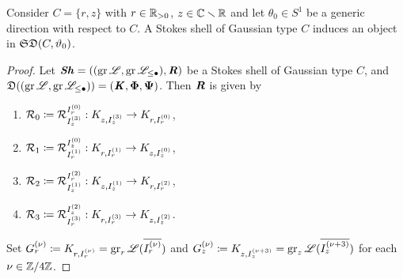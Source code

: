 \begin{lem}\label{shelltodata}
    Consider $C=\{r,z\}$ with $r \in \mathbb{R}_{>0}$, $z \in \mathbb{C} \smallsetminus \mathbb{R}$ and let $\theta_0 \in S^1$ be a generic direction with respect to $C$. A Stokes shell of Gaussian type $C$ induces an object in $\mathfrak{SD}(C,\vartheta_0)$.
\end{lem}
\begin{proof} 
    Let $\bm{\mathit{Sh}} =((\operatorname{gr}\mathscr{L}, \operatorname{gr}\mathscr{L}_{\leq \bullet}),\bm{\mathit{R}})$ be a Stokes shell of Gaussian type $C$, and $\mathfrak{D}((\operatorname{gr}\mathscr{L}, \operatorname{gr}\mathscr{L}_{\leq \bullet})) = (\bm{\mathit{K}}, \bm{\Phi},\bm{\Psi})$. Then $\bm{\mathit{R}}$ is given by 
    \begin{multicols}{2} %
        \begin{enumerate}
        \item $\mathcal{R}_0 \coloneqq \mathcal{R}_{I_z^{(3)}}^{I_r^{(0)}}:K_{z,I_z^{(3)}} \to K_{r,I_r^{(0)}}$,
        \item $\mathcal{R}_1 \coloneqq \mathcal{R}_{I_r^{(1)}}^{I_z^{(0)}}: K_{r, I_r^{(1)}} \to K_{z,I_z^{(0)}}$,
        \item $\mathcal{R}_2 \coloneqq \mathcal{R}_{I_z^{(1)}}^{I_r^{(2)}}: K_{z,I_z^{(1)}} \to K_{r,I_r^{(2)}}$,
        \item $\mathcal{R}_3 \coloneqq \mathcal{R}_{I_r^{(3)}}^{I_z^{(2)}}: K_{r, I_r^{(3)}} \to K_{z,I_z^{(2)}}$. 
    \end{enumerate}
    \end{multicols} %
    Set $G_r^{(\nu)}\coloneqq K_{r,I_r^{(\nu)}}=\operatorname{gr}_r\mathscr{L}(\overline{I_r^{(\nu)}})$ and $G_z^{(\nu)}\coloneqq K_{z,I_z^{(\nu+3)}}=\operatorname{gr}_z\mathscr{L}(\overline{I_z^{(\nu+3)}})$ for each $\nu \in \mathbb{Z}/4\mathbb{Z}$.
    

\end{proof}
